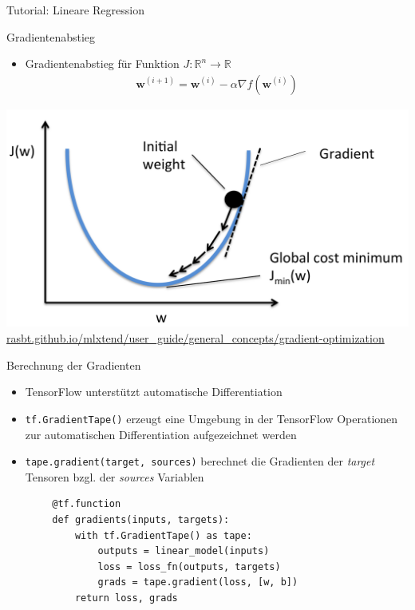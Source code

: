 \documentclass[utf8, smaller, c]{beamer}
\renewcommand{\tt}[1]{{\texttt{#1}}}
\begin{document}
\begin{frame}{Tutorial: Lineare Regression}
	\framebreak
	
	\begin{block}{Gradientenabstieg}
	    \begin{itemize}
	        \item Gradientenabstieg für Funktion $J\colon\mathbb{R}^n \rightarrow \mathbb{R}$
			\begin{align*}
			\mathbf{w}^{(i+1)} = \mathbf{w}^{(i)} - \alpha\nabla f(\mathbf{w}^{(i)})
			\end{align*}
	    \end{itemize}
	    \centering
		\includegraphics[scale=0.09]{pics/gradient_descent}
		{\tiny\url{rasbt.github.io/mlxtend/user_guide/general_concepts/gradient-optimization}}
	\end{block}
		
	\framebreak
	
	\begin{block}{Berechnung der Gradienten}
	    \begin{itemize}
	        \item TensorFlow unterstützt automatische Differentiation
	        \item \tt{tf.GradientTape()} erzeugt eine Umgebung in der TensorFlow Operationen zur automatischen Differentiation aufgezeichnet werden
	        \item \tt{tape.gradient(target, sources)} berechnet die Gradienten der \textit{target} Tensoren bzgl. der \textit{sources} Variablen
	    \end{itemize}
	    \begin{lstlisting}
        @tf.function
        def gradients(inputs, targets):
            with tf.GradientTape() as tape:
                outputs = linear_model(inputs)
                loss = loss_fn(outputs, targets)
                grads = tape.gradient(loss, [w, b])
            return loss, grads
	    \end{lstlisting}
	\end{block}
	

\end{frame}
\end{document}
